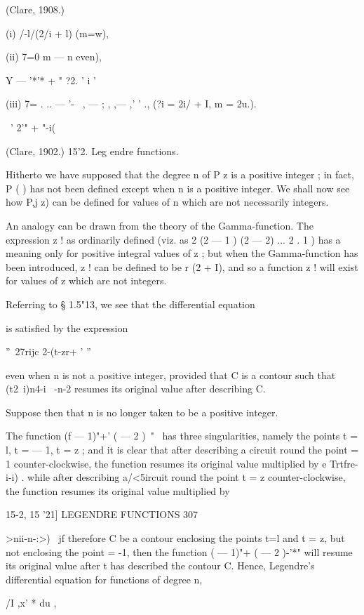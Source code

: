 {(Clare, 1908.)

(i) /-l/(2/i + l) (m=w),

(ii) 7=0 m — n even),

Y — '*'* + " ?2. ' i '

(iii) 7= . .. — '-~ , — ; , ,— ,' ' ., (?i = 2i/ + I, m = 2u.).

\ ' 2'" + "-i(%

(Clare, 1902.) 15'2. Leg endre functions.

Hitherto we have supposed that the degree n of P z is a positive
integer ; in fact, P ( ) has not been defined except when n is a
positive integer. We shall now see how P,j z) can be defined for
values of n which are not necessarily integers.

An analogy can be drawn from the theory of the Gamma-function. The
expression z ! as ordinarily defined (viz. as 2 (2 — 1 ) (2 — 2) ... 2
. 1 ) has a meaning only for positive integral values of z ; but when
the Gamma-function has been introduced, z ! can be defined to be r (2
+ I), and so a function z ! will exist for values of z which are not
integers.

Referring to § 1.5"13, we see that the differential equation

is satisfied by the expression

''~27rijc 2-(t-zr+ ' ''

even when n is not a positive integer, provided that C is a contour
such that (t2\ i)n4-i \ -n-2 resumes its original value after
describing C.

Suppose then that n is no longer taken to be a positive integer.

The function (f — 1)"+' ( — 2 )~"~ has three singularities, namely the
points t = l, t = — 1, t = z ; and it is clear that after describing a
circuit round the point = 1 counter-clockwise, the function resumes
its original value multiplied by e Trtfre-i-i) . while after
describing a/<5ircuit round the point t = z counter-clockwise, the
function resumes its original value multiplied by

15-2, 15 '21] LEGENDRE FUNCTIONS 307

  >nii-n-:>) \ jf therefore C be a contour enclosing the points t=l
and t = z, but not enclosing the point = -1, then the function ( —
1)"+ ( — 2 )-'*" will resume its original value after t has described
the contour C. Hence, Legendre's differential equation for functions
of degree n,

/I ,x' * du ,

}
